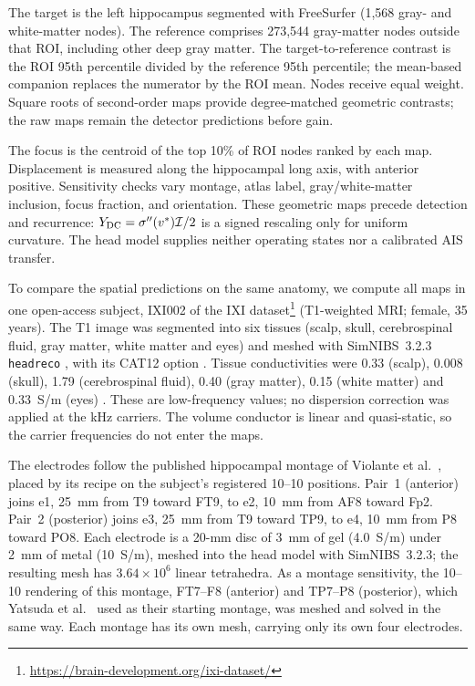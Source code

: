 \documentclass[11pt,a4paper]{article}
\newcommand{\Sig}{\sigma}
\begin{document}
The target is the left hippocampus segmented with FreeSurfer (1,568 gray- and
white-matter nodes). The reference comprises 273,544 gray-matter nodes outside
that ROI, including other deep gray matter. The target-to-reference contrast
is the ROI 95th percentile divided by the reference 95th percentile; the
mean-based companion replaces the numerator by the ROI mean. Nodes receive
equal weight. Square roots of second-order maps provide degree-matched geometric
contrasts; the raw maps remain the detector predictions before gain.

The focus is the centroid of the top 10\% of ROI nodes ranked by each map.
Displacement is measured along the hippocampal long axis, with anterior positive.
Sensitivity checks vary montage, atlas label, gray/white-matter inclusion,
focus fraction, and orientation. These geometric maps precede detection and
recurrence: $Y_{\rm DC}=\Sig''(v^*)\mathcal I/2$ is a signed rescaling only
for uniform curvature. The head model supplies neither operating states nor
a calibrated AIS transfer.

\else
\label{supp:fem-protocol}
To compare the spatial predictions on the same anatomy, we compute all maps
in one open-access subject,
IXI002 of the IXI dataset\footnote{\url{https://brain-development.org/ixi-dataset/}}
(T1-weighted MRI; female, 35 years). The T1 image was segmented into six tissues
(scalp, skull, cerebrospinal fluid, gray matter, white matter and eyes) and meshed with
SimNIBS~3.2.3 \texttt{headreco} \cite{nielsen2018}, with its CAT12 option
\cite{gaser2024}. Tissue conductivities were 0.33 (scalp), 0.008 (skull), 1.79
(cerebrospinal fluid), 0.40 (gray matter), 0.15 (white matter) and 0.33~S/m (eyes)
\cite{salvador2025}. These are low-frequency values; no dispersion correction was
applied at the kHz carriers. The volume conductor is linear and quasi-static, so the
carrier frequencies do not enter the maps.

The electrodes follow the published hippocampal montage of Violante et al.\
\cite{violante2023}, placed by its recipe on the subject's registered 10--10
positions. Pair~1 (anterior) joins e1, 25~mm from T9 toward FT9, to e2, 10~mm from AF8
toward Fp2. Pair~2 (posterior) joins e3, 25~mm from T9 toward TP9, to e4, 10~mm from P8
toward PO8. Each electrode is a 20-mm disc of 3~mm of gel (4.0~S/m) under 2~mm of metal
(10~S/m), meshed into the head model with SimNIBS~3.2.3; the resulting mesh has
$3.64\times10^6$ linear tetrahedra. As a montage sensitivity, the 10--10 rendering of
this montage, FT7--F8 (anterior) and TP7--P8 (posterior), which Yatsuda et al.\
\cite{yatsuda2024} used as their starting montage, was meshed and solved in the same
way. Each montage has its own mesh, carrying only its own four electrodes.
\end{document}
